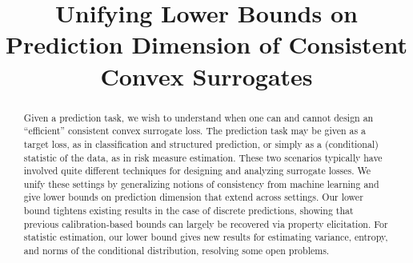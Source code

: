 \documentclass[anon,12pt]{colt2021} %
\title{Unifying Lower Bounds on Prediction Dimension of Consistent Convex Surrogates}
\begin{document}
\maketitle

\begin{abstract}
Given a prediction task, we wish to understand when one can and cannot design an ``efficient'' consistent convex surrogate loss.
The prediction task may be given as a target loss, as in classification and structured prediction, or simply as a (conditional) statistic of the data, as in risk measure estimation.
These two scenarios typically have involved quite different techniques for designing and analyzing surrogate losses.
We unify these settings by generalizing notions of consistency from machine learning and give lower bounds on prediction dimension that extend across settings.
Our lower bound tightens existing results in the case of discrete predictions, showing that previous calibration-based bounds can largely be recovered via property elicitation.
For statistic estimation, our lower bound gives new results for estimating variance, entropy, and norms of the conditional distribution, resolving some open problems.
%
%
\end{abstract}
\end{document}
